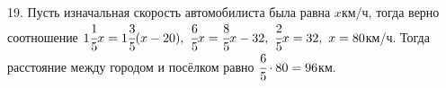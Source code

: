 19. Пусть изначальная скорость автомобилиста была равна $x$км/ч, тогда верно соотношение $1\cfrac{1}{5}x=1\cfrac{3}{5}(x-20),\ \cfrac{6}{5}x=\cfrac{8}{5}x-32,\
\cfrac{2}{5}x=32,\ x=80$км/ч. Тогда расстояние между городом и посёлком равно $\cfrac{6}{5}\cdot80=96$км.\\
